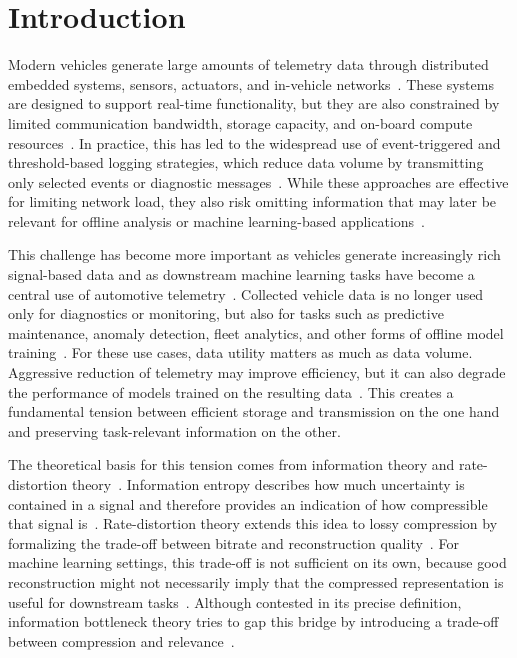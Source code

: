 \chapter{Introduction}
\label{chap:introduction}

Modern vehicles generate large amounts of telemetry data through distributed embedded systems, sensors, actuators, and in-vehicle networks~\cite{Lee2017,Navet2009,MITRE2023}. These systems are designed to support real-time functionality, but they are also constrained by limited communication bandwidth, storage capacity, and on-board compute resources~\cite{Navet2009}. In practice, this has led to the widespread use of event-triggered and threshold-based logging strategies, which reduce data volume by transmitting only selected events or diagnostic messages~\cite{AUTOSAR2022b,Navet2009}. While these approaches are effective for limiting network load, they also risk omitting information that may later be relevant for offline analysis or machine learning-based applications~\cite{Navet2009,EventDrivenDiagPatent}.

This challenge has become more important as vehicles generate increasingly rich signal-based data and as downstream machine learning tasks have become a central use of automotive telemetry~\cite{Bertoncello2021,Samantaray2023,Theissler2021}. Collected vehicle data is no longer used only for diagnostics or monitoring, but also for tasks such as predictive maintenance, anomaly detection, fleet analytics, and other forms of offline model training~\cite{Theissler2021,Oezdemir2024,Brunheroto2022}. For these use cases, data utility matters as much as data volume. Aggressive reduction of telemetry may improve efficiency, but it can also degrade the performance of models trained on the resulting data~\cite{Tirupathi2022,Eichinger2015,Moon2018}. This creates a fundamental tension between efficient storage and transmission on the one hand and preserving task-relevant information on the other.

The theoretical basis for this tension comes from information theory and rate-distortion theory~\cite{Shannon1948,Shannon1949}. Information entropy describes how much uncertainty is contained in a signal and therefore provides an indication of how compressible that signal is~\cite{Shannon1948}. Rate-distortion theory extends this idea to lossy compression by formalizing the trade-off between bitrate and reconstruction quality~\cite{Shannon1949}. For machine learning settings, this trade-off is not sufficient on its own, because good reconstruction might not necessarily imply that the compressed representation is useful for downstream tasks~\cite{Marchioni2024,Cuza2024}. Although contested in its precise definition, information bottleneck theory tries to gap this bridge by introducing a trade-off between compression and relevance~\cite{Tishby2000}.


